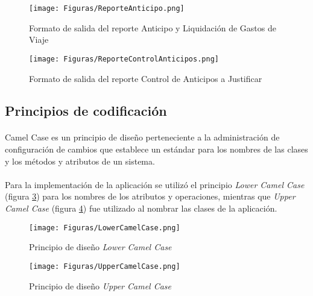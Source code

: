 \begin{figure}%
	\centering
	\texttt{[image: Figuras/ReporteAnticipo.png]}
	\caption{Formato de salida del reporte Anticipo y Liquidación de Gastos de Viaje}
	\label{fig:ReporteAnticipo}
\end{figure}

\begin{figure}%
	\centering
	\texttt{[image: Figuras/ReporteControlAnticipos.png]}
	\caption{Formato de salida del reporte Control de Anticipos a Justificar}
	\label{fig:ReporteControlAnticipo}
\end{figure}

\subsection{Principios de codificación}
\paragraph{}Camel Case es un principio de diseño perteneciente a la administración de configuración de cambios que establece un estándar para los nombres de las clases y los métodos y atributos de un sistema.
\paragraph{}Para la implementación de la aplicación se utilizó el principio \textit{Lower Camel Case} (figura \ref{fig:LowerCamelCase}) para los nombres de los atributos y operaciones, mientras que \textit{Upper Camel Case} (figura \ref{fig:UpperCamelCase}) fue utilizado al nombrar las clases de la aplicación.

\begin{figure}[H] %
	\centering
	\texttt{[image: Figuras/LowerCamelCase.png]}
	\caption{Principio de diseño \textit{Lower Camel Case}}
	\label{fig:LowerCamelCase}
\end{figure}

\begin{figure}[H] %
	\centering
	\texttt{[image: Figuras/UpperCamelCase.png]}
	\caption{Principio de diseño \textit{Upper Camel Case}}
	\label{fig:UpperCamelCase}
\end{figure}

